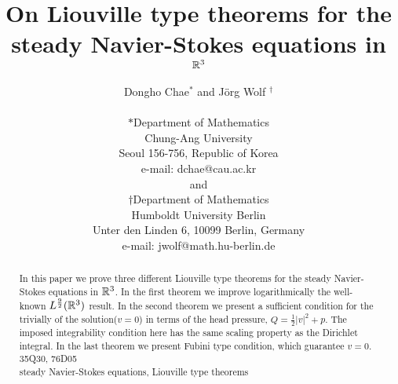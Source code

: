 \documentclass[12pt]{article}
\numberwithin{equation}{section}
\theoremstyle{definition}
\begin{document}
\title{On Liouville type theorems for the steady Navier-Stokes equations in $\Bbb R^3$}
\author{Dongho Chae$^*$  and J\"{o}rg Wolf $^\dagger$\\
\ \\
 $*$Department of Mathematics\\
Chung-Ang University\\
 Seoul 156-756, Republic of Korea\\
 e-mail: dchae@cau.ac.kr\\
and \\
$\dagger$Department of Mathematics\\
Humboldt University Berlin\\
Unter den Linden 6, 10099 Berlin, Germany\\
e-mail: jwolf@math.hu-berlin.de}
\date{}
\maketitle

\begin{abstract}
In this paper we prove three different Liouville type theorems for the steady Navier-Stokes equations in $\Bbb R^3$.
In the first theorem we improve logarithmically the well-known $L^{\frac92} (\Bbb R^3)$ result. In the second theorem we present a sufficient 
condition for the trivially of the solution($v=0$) in terms of the head pressure, $Q=\frac12 |v|^2 +p$. The imposed integrability condition here has  the same scaling property as the Dirichlet integral.
In the last theorem we present Fubini type condition, which guarantee $v=0$.\\
 35Q30, 76D05\\
   steady Navier-Stokes equations, Liouville type theorems
\end{abstract}
\end{document}
